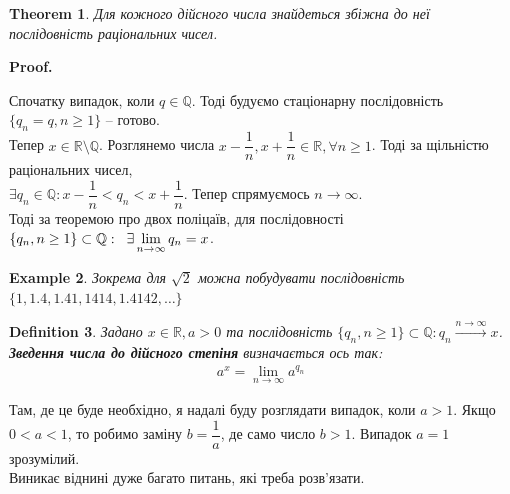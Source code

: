 \documentclass[a4paper, 14pt]{article}
\makeatletter
\def\qed{$\blacksquare$}
\theoremstyle{theoremdd}
\newtheorem{theorem}{Theorem}[subsection]
\theoremstyle{theoremdd}
\newtheorem{definition}[theorem]{Definition}
\theoremstyle{theoremdd}
\theoremstyle{theoremdd}
\newtheorem{example}[theorem]{Example}
\theoremstyle{theoremdd}
\theoremstyle{theoremdd}
\theoremstyle{theoremdd}
\theoremstyle{theoremdd}
\renewenvironment{proof}[1][Proof.\\]{\par
\pushQED{\hfill \qed}%
\normalfont \topsep6\p@\@plus6\p@\relax
\trivlist
\item\relax
{\bfseries
#1\@addpunct{.}}\hspace\labelsep\ignorespaces
}{%
\popQED\endtrivlist\@endpefalse
}
\makeatother
\begin{document}
\begin{theorem}
	Для кожного дійсного числа знайдеться збіжна до неї послідовність раціональних чисел.
\end{theorem}
	
	\begin{proof}
	Спочатку випадок, коли $q \in \mathbb{Q}$. Тоді будуємо стаціонарну послідовність $\{q_n = q, n \geq 1\}$ -- готово.
	\bigskip \\
	Тепер $x \in \mathbb{R} \setminus \mathbb{Q}$. Розглянемо числа $x - \dfrac{1}{n}, x + \dfrac{1}{n} \in \mathbb{R}, \forall n \geq 1$. Тоді за щільністю раціональних чисел,\\
	$\exists q_n \in \mathbb{Q}: x - \dfrac{1}{n} < q_n < x + \dfrac{1}{n}$. Тепер спрямуємось $n \to \infty$. \\
	Тоді за теоремою про двох поліцаїв, для послідовності $\{q_n, n \geq 1\} \subset \mathbb{Q}: \hspace{0.2cm} \exists \displaystyle\lim_{n \to \infty} q_n = x$.
	\end{proof}
	
	\begin{example}
	Зокрема для $\sqrt{2}$ можна побудувати послідовність $\{1,1.4,1.41,1414,1.4142,\dots\}$
	\end{example}
	

\begin{definition}
Задано $x \in \mathbb{R}, a > 0$ та послідовність $\{q_n, n \geq 1\} \subset \mathbb{Q}: q_n \xrightarrow{n \to \infty} x$.\\
\textbf{Зведення числа до дійсного степіня} визначається ось так:
\begin{align*}
a^x = \displaystyle\lim_{n \to \infty} a^{q_n}
\end{align*}
\end{definition}

Там, де це буде необхідно, я надалі буду розглядати випадок, коли $a > 1$. Якщо $0 < a < 1$, то робимо заміну $b = \dfrac{1}{a}$, де само число $b > 1$. Випадок $a = 1$ зрозумілий.\\
Виникає віднині дуже багато питань, які треба розв'язати.
\end{document}

